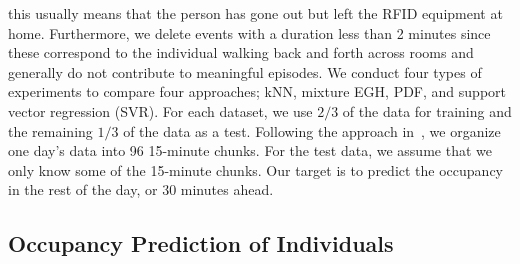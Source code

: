 this usually means that the person has gone out but left the RFID equipment at home. 
Furthermore, we delete events with a duration less than 
2 minutes since these correspond to the individual walking back and forth across rooms and generally do not contribute to meaningful episodes. We conduct four types of experiments to compare four approaches; 
kNN, mixture EGH, PDF, and support vector regression (SVR). 
For each dataset, we use $2/3$ of the data for training and the remaining $1/3$ of the data as a test. 
Following the approach in~\cite{scott2011preheat},
we organize one day's data into 96 15-minute chunks. 
For the test data, we assume that we only know some of the 15-minute chunks. Our target is to predict the occupancy in the rest of the day, or 30 minutes ahead. 

\subsection{Occupancy Prediction of Individuals}


